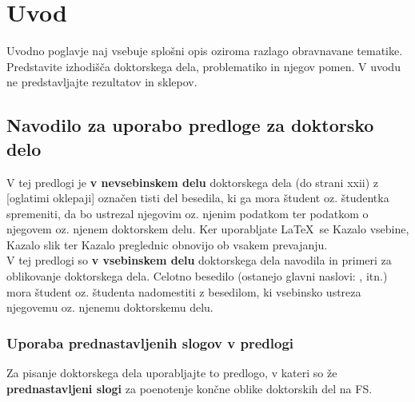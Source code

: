 \chapter{Uvod}\label{cha:uvod}

Uvodno poglavje naj vsebuje splošni opis oziroma razlago obravnavane tematike. Predstavite izhodišča doktorskega dela, problematiko in njegov pomen. V uvodu ne predstavljajte rezultatov in sklepov.

\section{Navodilo za uporabo predloge za doktorsko delo}\label{sec:uporaba_predloge}
V tej predlogi je \textbf{v nevsebinskem delu} doktorskega dela (do strani xxii) z [oglatimi oklepaji] označen tisti del besedila, ki ga mora študent oz. študentka spremeniti, da bo ustrezal njegovim oz. njenim podatkom ter podatkom o njegovem oz. njenem doktorskem delu. Ker uporabljate \LaTeX~se Kazalo vsebine, Kazalo slik ter Kazalo preglednic obnovijo ob vsakem prevajanju.\\

V tej predlogi so \textbf{v vsebinskem delu} doktorskega dela navodila in primeri za oblikovanje doktorskega dela. Celotno besedilo (ostanejo glavni naslovi: ,  itn.) mora študent oz. študenta nadomestiti z besedilom, ki vsebinsko ustreza njegovemu oz. njenemu doktorskemu delu.

\subsection{Uporaba prednastavljenih slogov v predlogi}\label{sec:prednastavitve}
Za pisanje doktorskega dela uporabljajte to predlogo, v kateri so že \textbf{prednastavljeni slogi} za poenotenje končne oblike doktorskih del na FS.\\

